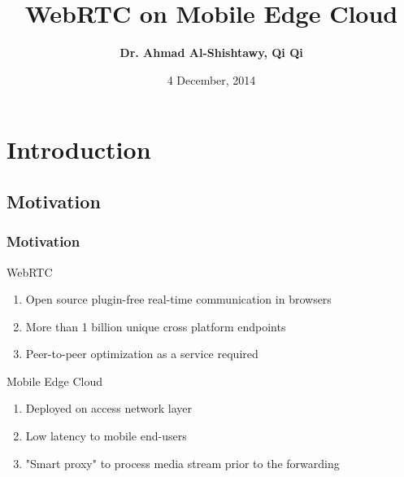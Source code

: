 \documentclass{beamer}
\title[Short title]{\textbf{WebRTC on Mobile Edge Cloud}} %
\author{\textbf{Dr. Ahmad Al-Shishtawy, Qi Qi}} %
\institute[SICS Swedish ICT] %
{
Swedish Institute of Computer Science \\ \textit{SICS Swedish ICT}\\ %
\medskip
\textit{ahmad@sics.se, qiq@sics.se} %
}
\date{4 December, 2014} %
\begin{document}
\begin{frame}
\titlepage %
\end{frame}



\section{Introduction} 
\subsection{Motivation}
\begin{frame}
\frametitle{Motivation}
\begin{alertblock}{WebRTC}
\begin{enumerate}
	\item Open source plugin-free real-time communication in browsers
	\item More than 1 billion unique cross platform endpoints 
	\item Peer-to-peer optimization as a service required
\end{enumerate}
\end{alertblock}

\begin{alertblock}{Mobile Edge Cloud}
\begin{enumerate}
	\item Deployed on access network layer
	\item Low latency to mobile end-users
	\item "Smart proxy" to process media stream prior to the forwarding
\end{enumerate}
\end{alertblock}
\end{frame}
\end{document}
